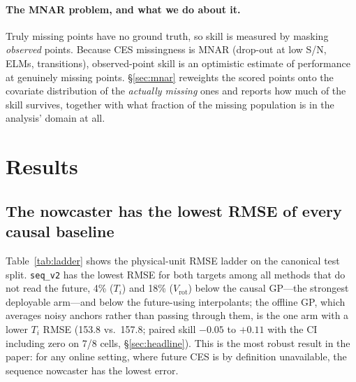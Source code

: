 \documentclass[10pt]{article}
\newcommand{\Ti}{\ensuremath{T_i}}
\newcommand{\Vrot}{\ensuremath{V_\mathrm{rot}}}
\newcommand{\seqv}{\texttt{seq\_v2}}
\begin{document}
\paragraph{The MNAR problem, and what we do about it.}
Truly missing points have no ground truth, so skill is measured by masking
\emph{observed} points. Because CES missingness is MNAR (drop-out at low S/N, ELMs,
transitions), observed-point skill is an optimistic estimate of performance at
genuinely missing points. \S\ref{sec:mnar} reweights the scored points onto the
covariate distribution of the \emph{actually missing} ones and reports how much of
the skill survives, together with what fraction of the missing population is in
the analysis' domain at all.

\section{Results}
\label{sec:results}

\subsection{The nowcaster has the lowest RMSE of every causal baseline}
Table~\ref{tab:ladder} shows the physical-unit RMSE ladder on the canonical test
split. \seqv{} has the lowest RMSE for both targets among all methods that do not
read the future, 4\% (\Ti) and 18\% (\Vrot) below the causal GP---the strongest
deployable arm---and below the future-using interpolants; the offline GP, which
averages noisy anchors rather than passing through them, is the one arm with a lower
\Ti{} RMSE (153.8 vs.\ 157.8; paired skill $-0.05$ to $+0.11$ with the CI including
zero on 7/8 cells, \S\ref{sec:headline}). This is the most robust result in the
paper: for any online setting, where future CES is by definition unavailable, the
sequence nowcaster has the lowest error.
\end{document}
